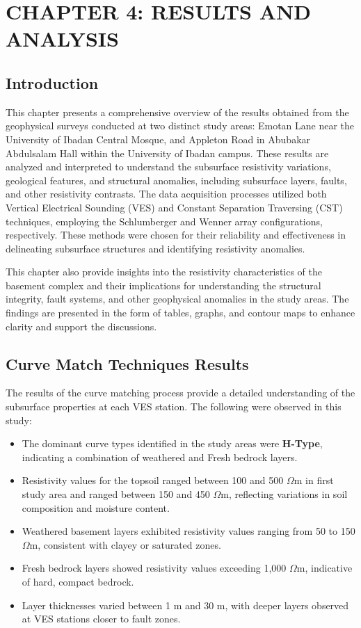 \documentclass[12pt,a4paper]{report}
\begin{document}
\chapter{CHAPTER 4: RESULTS AND ANALYSIS}

\section{Introduction}
\justifying
This chapter presents a comprehensive overview of the results obtained from the geophysical surveys conducted at two distinct study areas: Emotan Lane near the University of Ibadan Central Mosque, and Appleton Road in Abubakar Abdulsalam Hall within the University of Ibadan campus. These results are analyzed and interpreted to understand the subsurface resistivity variations, geological features, and structural anomalies, including subsurface layers, faults, and other resistivity contrasts. The data acquisition processes utilized both Vertical Electrical Sounding (VES) and Constant Separation Traversing (CST) techniques, employing the Schlumberger and Wenner array configurations, respectively. These methods were chosen for their reliability and effectiveness in delineating subsurface structures and identifying resistivity anomalies.

This chapter also provide insights into the resistivity characteristics of the basement complex and their implications for understanding the structural integrity, fault systems, and other geophysical anomalies in the study areas. The findings are presented in the form of tables, graphs, and contour maps to enhance clarity and support the discussions.

\section{Curve Match Techniques Results}
The results of the curve matching process provide a detailed understanding of the subsurface properties at each VES station. The following were observed in this study:

\begin{itemize}
    \item The dominant curve types identified in the study areas were \textbf{H-Type}, indicating a combination of weathered and Fresh bedrock layers.
    \item Resistivity values for the topsoil ranged between 100 and 500 $\Omega$m in first study area and ranged between 150 and 450 $\Omega$m, reflecting variations in soil composition and moisture content.
    \item Weathered basement layers exhibited resistivity values ranging from 50 to 150 $\Omega$m, consistent with clayey or saturated zones.
    \item Fresh bedrock layers showed resistivity values exceeding 1,000 $\Omega$m, indicative of hard, compact bedrock.
    \item Layer thicknesses varied between 1 m and 30 m, with deeper layers observed at VES stations closer to fault zones.
\end{itemize}
\end{document}
